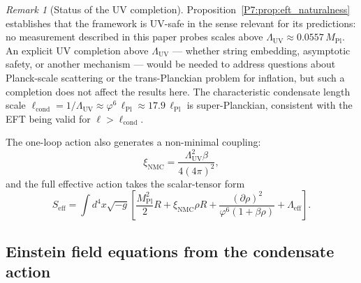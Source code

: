 \documentclass[11pt,a4paper]{article}
\theoremstyle{definition}
\theoremstyle{remark}
\newtheorem{remark}[theorem]{Remark}
\newcommand{\vp}{\varphi}
\newcommand{\MPl}{M_{\mathrm{Pl}}}
\newcommand{\LUV}{\Lambda_{\mathrm{UV}}}
\newcommand{\xNMC}{\xi_{\mathrm{NMC}}}
\begin{document}
\begin{remark}[Status of the UV completion]
\label{P7:rem:uv_completion_status}
Proposition~\ref{P7:prop:eft_naturalness} establishes that the framework
is UV-safe in the sense relevant for its predictions: no measurement
described in this paper probes scales above $\LUV\approx0.0557\,\MPl$.
An explicit UV completion above $\LUV$ --- whether string embedding,
asymptotic safety, or another mechanism --- would be needed to address
questions about Planck-scale scattering or the trans-Planckian problem
for inflation, but such a completion does not affect the results here.
The characteristic condensate length scale $\ell_\mathrm{cond}=1/\LUV
\approx\vp^6\,\ell_{\mathrm{Pl}}\approx17.9\,\ell_{\mathrm{Pl}}$
is super-Planckian, consistent with the EFT being valid for
$\ell>\ell_\mathrm{cond}$.
\end{remark}

The one-loop action also generates a non-minimal coupling:
\begin{equation}
  \xNMC = \frac{\LUV^2\beta}{4(4\pi)^2},
  \label{P7:eq:xNMC}
\end{equation}
and the full effective action takes the scalar-tensor form
\begin{equation}
  S_{\mathrm{eff}} = \int d^4x\sqrt{-g}\!\left[
    \frac{\MPl^2}{2}R
    + \xNMC\rho R
    + \frac{(\partial\rho)^2}{\vp^6(1+\beta\rho)}
    + \Lambda_{\mathrm{eff}}
  \right].
  \label{P7:eq:Seff}
\end{equation}

\subsection{Einstein field equations from the condensate action}
\label{P7:sec:einstein_eqs}
\end{document}

